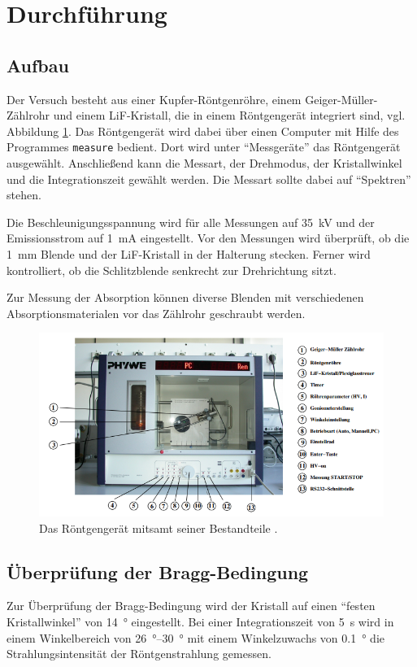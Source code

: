 \section{Durchführung}

\subsection{Aufbau}
Der Versuch besteht aus einer Kupfer-Röntgenröhre, einem Geiger-Müller-Zählrohr und einem LiF-Kristall,
die in einem Röntgengerät integriert sind, vgl. Abbildung \ref{fig:der_geraet}.
Das Röntgengerät wird dabei über einen Computer mit Hilfe des Programmes \texttt{measure} bedient.
Dort wird unter \enquote{Messgeräte} das Röntgengerät ausgewählt.
Anschließend kann die Messart, der Drehmodus, der Kristallwinkel und die Integrationszeit gewählt werden.
Die Messart sollte dabei auf \enquote{Spektren} stehen.

\noindent
Die Beschleunigungsspannung wird für alle Messungen auf \qty[]{35}{\kilo\volt} und der Emissionsstrom auf \qty[]{1}{\milli\ampere} eingestellt.
Vor den Messungen wird überprüft, ob die \qty[]{1}{\milli\meter} Blende und der LiF-Kristall in der Halterung stecken.
Ferner wird kontrolliert, ob die Schlitzblende senkrecht zur Drehrichtung sitzt.

\noindent
Zur Messung der Absorption können diverse Blenden mit verschiedenen Absorptionsmaterialen vor das Zählrohr geschraubt werden.

\begin{figure}[H]
    \centering
    \includegraphics[height = 6.5 cm]{Abbildungen/der_geraet.png}
    \caption{Das Röntgengerät mitsamt seiner Bestandteile \cite{man:v602}.}
    \label{fig:der_geraet}
\end{figure}


\subsection{Überprüfung der Bragg-Bedingung}
Zur Überprüfung der Bragg-Bedingung wird der Kristall auf einen \enquote{festen Kristallwinkel} von \qty[]{14}{\degree} eingestellt.
Bei einer Integrationszeit von \qty[]{5}{\second} wird in einem Winkelbereich von \qtyrange[]{26}{30}{\degree} mit einem Winkelzuwachs
von \qty[]{0.1}{\degree} die Strahlungsintensität der Röntgenstrahlung gemessen. 


